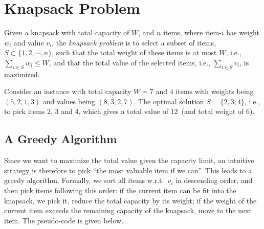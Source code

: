 \setcounter{definition}{0} \setcounter{property}{0} \setcounter{claim}{0} \setcounter{fact}{0} \setcounter{corollary}{0} \setcounter{figure}{0}
\section{Knapsack Problem}

Given a knapsack with total capacity of $W$, and $n$ items, where item-$i$ has weight $w_i$ and value $v_i$,
the \emph{knapsack problem} is to select a subset of items, $S\subset\{1,2,\cdots,n\}$, %
such that the total weight of these items is at most $W$, i.e., $\sum_{i \in S} w_i \le W$,
and that the total value of the selected items, i.e., $\sum_{i\in S} v_i$, is maximized.


Consider an instance with total capacity $W = 7$ and 4 items with weights being $(5, 2, 1, 3)$ and values being $(8, 3, 2, 7)$. 
	The optimal solution $S = \{2,3,4\}$, i.e.,
to pick items 2, 3 and 4, which gives a total value of 12~(and total weight of 6).

\subsection*{A Greedy Algorithm}

Since we want to maximize the total value given the capacity limit,
an intuitive strategy is therefore to pick ``the most valuable item if we can''.
This leads to a greedy algorithm. Formally, we sort all items w.r.t.\ $v_i$ in descending order,
and then pick items following this order: if the current item can be fit into the knapsack,
we pick it, reduce the total capacity by its weight; %
if the weight of the current item exceeds the remaining capacity of the knapsack, move to the next item. 
The pseudo-code is given below.

